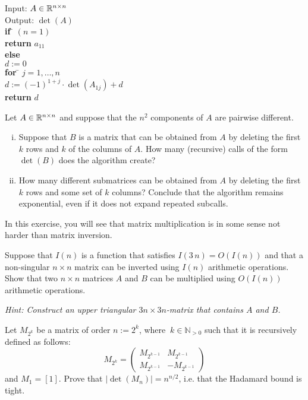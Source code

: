 \documentclass[11pt]{article}
\begin{document}
\begin{tabbing}
  Input: $A \in \mathbb{R}^{n \times n}$ \\
  Output: $\det(A)$ \\
  
  {\bf if} \= $(n=1)$ \\
           \> {\bf return} $a_{11}$ \\
  {\bf else} \\
           \> $d:=0$  \\
           \> {\bf for } \= $j=1,\dots,n$ \\
           \>            \> $d:= (-1)^{1+j}⋅ \det(A_{1j}) +d$\\
           \> {\bf return} $d$   
\end{tabbing}

Let $A \in \mathbb{R}^{n \times n}$  and suppose that the $n^2$ components of $A$ are pairwise different.
\begin{enumerate}[i)]
\item
Suppose that $B$ is a matrix that can be obtained from $A$ by deleting the first $k$ rows and $k$ of the columns of $A$. How many (recursive) calls of the form $\det(B)$ does the algorithm create? 

\item How many different submatrices can be obtained from $A$ by deleting the first $k$ rows and some set of $k$ columns? Conclude that the algorithm remains exponential, even if it does not expand repeated subcalls. 
\end{enumerate}
  
\problem In this exercise, you will see that matrix multiplication is in some sense not harder than matrix inversion. 

Suppose that $I(n)$ is a function that satisfies $I(3\,n) = O(I(n))$ and that a non-singular  $n \times n$ matrix can be inverted using $I(n)$ arithmetic operations. Show that two $n \times n $ matrices $A$ and $B$ can be multiplied using $O(I(n))$ arithmetic operations. 

\emph{Hint: Construct an upper triangular $3n \times 3n$-matrix that contains $A$ and $B$. }

\problemstar Let $M_{2^k}$ be a matrix of order $n:=2^k$, where $\ k \in \mathbb{N}_{>0}$ such that it is recursively defined as follows:
\begin{equation}
M_{2^k}=
\begin{pmatrix}
    M_{2^{k-1}} & M_{2^{k-1}} \\ 
    M_{2^{k-1}} & -M_{2^{k-1}} 
  \end{pmatrix}
\end{equation}
and $M_1=[1]$. Prove that $|\det(M_{n})|=n^{n/2}$, i.e. that the Hadamard bound is tight.
\end{document}
